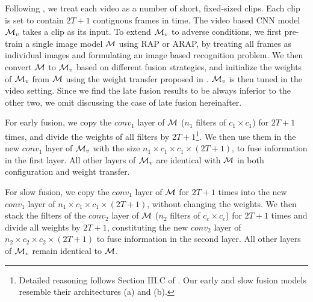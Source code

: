 \documentclass[10pt,twocolumn,twoside]{IEEEtran} %
\begin{document}
Following \cite{karpathy2014large}, we treat each video as a number of short, fixed-sized clips. Each clip is set to contain $2T + 1$ contiguous frames in time.
The video based CNN model ${\mathcal{M}}_v$ takes a clip as its input. To extend ${\mathcal{M}}_v$ to adverse conditions, we first pre-train a single image model ${\mathcal{M}}$ using RAP or ARAP, by treating all frames as individual images and formulating an image based recognition problem. We then convert ${\mathcal{M}}$ to ${\mathcal{M}}_v$ based on different fusion strategies, and initialize the weights of ${\mathcal{M}}_v$ from ${\mathcal{M}}$ using the weight transfer proposed in \cite{kappeler2016video}. ${\mathcal{M}}_v$ is then tuned in the video setting. Since we find the late fusion results to be always inferior to the other two, we omit discussing the case of late fusion hereinafter.

For early fusion, we copy the $conv_1$ layer of ${\mathcal{M}}$ ($n_1$ filters of $c_1 \times c_1$) for $2T + 1$ times, and divide the weights of all filters by $2T+1$\footnote{
Detailed reasoning follows Section III.C of \cite{kappeler2016video}. Our early and slow fusion models resemble their architectures (a) and (b). }. 
We then use them in the new $conv_1$ layer of ${\mathcal{M}}_v$ with the size $n_1 \times c_1 \times c_1 \times (2T+1)$, to fuse information in the first layer.
All other layers of ${\mathcal{M}}_v$ are identical with ${\mathcal{M}}$ in both configuration and weight transfer. 

For slow fusion, we copy the $conv_1$ layer of ${\mathcal{M}}$ for $2T + 1$ times into the new $conv_1$ layer of $n_1 \times c_1 \times c_1 \times (2T+1)$, without changing the weights. 
We then stack the filters of the $conv_2$ layer of ${\mathcal{M}}$  ($n_2$ filters of $c_c \times c_c$)  for $2T + 1$ times and divide all weights by $2T+1$, constituting the new $conv_2$ layer of $n_2 \times c_2 \times c_2 \times (2T+1)$ to fuse information in the second layer.
All other layers of ${\mathcal{M}}_v$ remain identical to ${\mathcal{M}}$.
\end{document}
